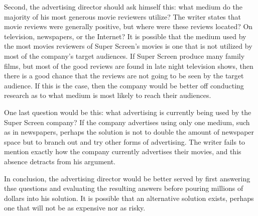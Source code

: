 Second, the advertising director should ask himself this: what medium do the majority of his most generous movie reviewers utilize?
The writer states that movie reviews were generally positive, but where were these reviews located?
On television, newspapers, or the Internet?
It is possible that the medium used by the most movies reviewers of Super Screen's movies is one that is not utilized by most of the company's target audiences.
If Super Screen produce many family films, but most of the good reviews are found in late night television shows, then there is a good chance that the reviews are not going to be seen by the target audience.
If this is the case, then the company would be better off conducting research as to what medium is most likely to reach their audiences.

One last question would be this: what advertising is currently being used by the Super Screen company?
If the company advertises using only one medium, such as in newspapers, perhaps the solution is not to double the amount of newspaper space but to branch out and try other forms of advertising.
The writer fails to mention exactly how the company currently advertises their movies, and this absence detracts from his argument.

In conclusion, the advertising director would be better served by first answering thse questions and evaluating the resulting answers before pouring millions of dollars into his solution.
It is possible that an alternative solution exists, perhaps one that will not be as expensive nor as risky.